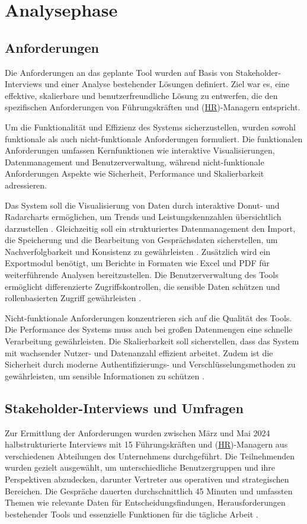 \chapter{Analysephase}
\label{chap:analysephase}

\section{Anforderungen} Die Anforderungen an das geplante Tool wurden auf Basis von Stakeholder-Interviews und einer Analyse bestehender Lösungen definiert. Ziel war es, eine effektive, skalierbare und benutzerfreundliche Lösung zu entwerfen, die den spezifischen Anforderungen von Führungskräften und (\hyperref[abkuerzungen]{HR})-Managern entspricht.

Um die Funktionalität und Effizienz des Systems sicherzustellen, wurden sowohl funktionale als auch nicht-funktionale Anforderungen formuliert. Die funktionalen Anforderungen umfassen Kernfunktionen wie interaktive Visualisierungen, Datenmanagement und Benutzerverwaltung, während nicht-funktionale Anforderungen Aspekte wie Sicherheit, Performance und Skalierbarkeit adressieren.

Das System soll die Visualisierung von Daten durch interaktive Donut- und Radarcharts ermöglichen, um Trends und Leistungskennzahlen übersichtlich darzustellen \cite{kirk2016data}. Gleichzeitig soll ein strukturiertes Datenmanagement den Import, die Speicherung und die Bearbeitung von Gesprächsdaten sicherstellen, um Nachverfolgbarkeit und Konsistenz zu gewährleisten \cite{bryson2011employee}. Zusätzlich wird ein Exportmodul benötigt, um Berichte in Formaten wie Excel und PDF für weiterführende Analysen bereitzustellen. Die Benutzerverwaltung des Tools ermöglicht differenzierte Zugriffskontrollen, die sensible Daten schützen und rollenbasierten Zugriff gewährleisten \cite{duarte2012performance}.

Nicht-funktionale Anforderungen konzentrieren sich auf die Qualität des Tools. Die Performance des Systems muss auch bei großen Datenmengen eine schnelle Verarbeitung gewährleisten. Die Skalierbarkeit soll sicherstellen, dass das System mit wachsender Nutzer- und Datenanzahl effizient arbeitet. Zudem ist die Sicherheit durch moderne Authentifizierungs- und Verschlüsselungsmethoden zu gewährleisten, um sensible Informationen zu schützen \cite{sommerville2015, nygard2018, schneier1996}.


\section{Stakeholder-Interviews und Umfragen}
Zur Ermittlung der Anforderungen wurden zwischen März und Mai 2024 halbstrukturierte Interviews mit 15 Führungskräften und (\hyperref[abkuerzungen]{HR})-Managern aus verschiedenen Abteilungen des Unternehmens durchgeführt. Die Teilnehmenden wurden gezielt ausgewählt, um unterschiedliche Benutzergruppen und ihre Perspektiven abzudecken, darunter Vertreter aus operativen und strategischen Bereichen. Die Gespräche dauerten durchschnittlich 45 Minuten und umfassten Themen wie relevante Daten für Entscheidungsfindungen, Herausforderungen bestehender Tools und essenzielle Funktionen für die tägliche Arbeit \cite{bryman2015social}.

